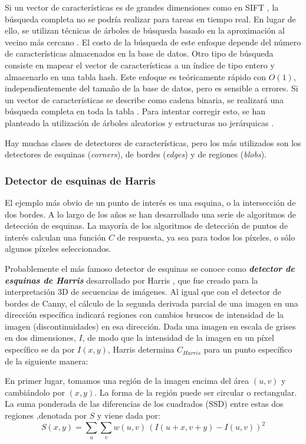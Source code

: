 \begin{itemize}
  Si un vector de características es de grandes dimensiones como en SIFT \cite{Lowe}, la búsqueda completa no se podría realizar para tareas en tiempo real. En lugar de ello,  se utilizan técnicas de árboles de búsqueda basado en la aproximación al vecino más cercano \cite{Arya} \cite{Muja}. El costo de la búsqueda de este enfoque depende del número de características almacenados en la base de datos. Otro tipo de búsqueda consiste en mapear el vector de características a un índice de tipo entero \cite{Datar} y almacenarlo en una tabla hash. Este enfoque es teóricamente rápido con $O(1)$, independientemente del tamaño de la base de datos, pero es sensible a errores. Si un vector de características se describe como cadena binaria, se realizará una búsqueda completa en toda la tabla \cite{Calonder}. Para intentar corregir esto, se han planteado la utilización de árboles aleatorios \cite{Lepetit} y estructuras no jerárquicas \cite{Ozuysal}.
\end{itemize}

Hay muchas clases de detectores de características, pero los más utilizados son los detectores de esquinas (\emph{corners}), de bordes (\emph{edges}) y de regiones (\emph{blobs}). 

\subsubsection{Detector de esquinas de Harris}
El ejemplo más obvio de un punto de interés es una esquina, o la intersección de dos bordes. A lo largo de los años se han desarrollado una serie de algoritmos de detección de esquinas. La mayoría de los algoritmos de detección de puntos de interés calculan una función $C$ de respuesta, ya sea para todos los píxeles, o sólo algunos píxeles seleccionados. 

Probablemente el más famoso detector de esquinas se conoce como \textbf{\textit{detector de esquinas de Harris}} desarrollado por Harris \cite{Harris}, que fue creado para la interpretación 3D de secuencias de imágenes. Al igual que con el detector de bordes de Canny, el cálculo de la segunda derivada parcial de una imagen en una dirección específica indicará regiones con cambios bruscos de intensidad de la imagen (discontinuidades) en esa dirección. Dada una imagen en escala de grises en dos dimensiones, $I$, de modo que la intensidad de la imagen en un píxel específico se da por $I(x,y)$, Harris determina $C_{Harris}$ para un punto específico de la siguiente manera: 

En primer lugar, tomamos una región de la imagen encima del área $(u,v)$ y cambiándolo por $(x,y)$. La forma de la región puede ser circular o rectangular. La suma ponderada de las diferencias de los cuadrados (SSD) entre estas dos regiones ,denotada por $S$ y viene dada por:
\begin{equation}
  S(x,y) = \sum_u \sum_v w(u,v) \, \left( I(u+x,v+y) - I(u,v)\right)^2
\end{equation}

